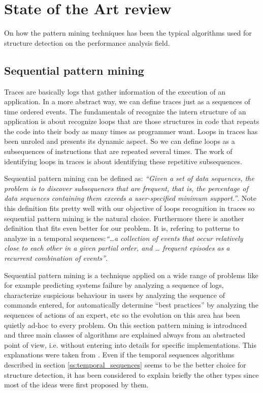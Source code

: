 \chapter{State of the Art review}

On how the pattern mining techniques has been the typical algorithms used for
structure detection on the performance analysis field.

\section{Sequential pattern mining}\label{pattern_mining}

Traces are basically logs that gather information of the execution of an
application. In a more abstract way, we can define traces just as a sequences
of time ordered events. The fundamentals of recognize the intern structure of an
application is about recognize loops that are those structures in code that
repeats the code into their body as many times as programmer want. Loops in
traces has been unroled and presents its dynamic aspect. So we can define loops
as a subsequences of instructions that are repeated several times. The work of
identifying loops in traces is about identifying these repetitive subsequences.

Sequential pattern mining can be defined as: \textit{``Given a set of data sequences, the
problem is to discover subsequences that are frequent, that is, the percentage of
data sequences containing them exceeds a user-specified minimum support.''}. Note 
this definition fits pretty well with our objective of loops recognition in traces 
so sequential pattern mining is the natural choice. Furthermore there is another
definition that fits even better for our problem. It is, refering to patterns to
analyze in a temporal sequences:\textit{``\ldots a collection of events that
occur relatively close to each other in a given partial order, and \ldots
frequent episodes as a recurrent combination of events''}.

Sequential pattern mining is a technique applied on a wide range of problems
like for example predicting systems failure by analyzing a sequence of logs,
characterize suspicious behaviour in users by analyzing the sequence of commands
entered, for automatically determine “best practices” by analyzing the sequences
of actions of an expert, etc so the evolution on this area has been quietly
ad-hoc to every problem. On this section pattern mining is introduced and three
main classes of algorithms are explained always from an abstracted point of
view, i.e. without entering into details for specific implementations. This
explanations were taken from \cite{mooney2013sequential}. Even if the temporal
sequences algorithms described in section \ref{ss:temporal_sequences} seems to
be the better choice for structure detection, it has been considered to explain
briefly the other types since most of the ideas were first proposed by them.

